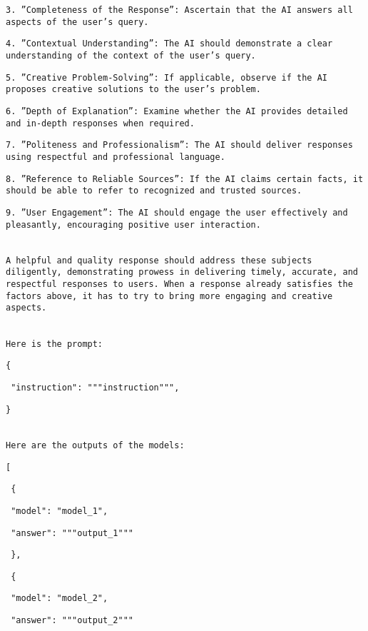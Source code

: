 \texttt{3. ”Completeness of the Response”: Ascertain that the AI answers all aspects of the user’s query.}

\texttt{4. ”Contextual Understanding”: The AI should demonstrate a clear understanding of the context of the user’s query.}

\texttt{5. ”Creative Problem-Solving”: If applicable, observe if the AI proposes creative solutions to the user’s problem.}

\texttt{6. ”Depth of Explanation”: Examine whether the AI provides detailed and in-depth responses when required.}

\texttt{7. ”Politeness and Professionalism”: The AI should deliver responses using respectful and professional language.}

\texttt{8. ”Reference to Reliable Sources”: If the AI claims certain facts, it should be able to refer to recognized and trusted sources.}

\texttt{9. ”User Engagement”: The AI should engage the user effectively and pleasantly, encouraging positive user interaction.}

\texttt{\\A helpful and quality response should address these subjects diligently, demonstrating prowess in delivering timely, accurate, and respectful responses to users. When a response already satisfies the factors above, it has to try to bring more engaging and creative aspects.}

\texttt{\\Here is the prompt:}

\texttt{\{}

\indent\texttt{    "instruction": """{instruction}""",}

\texttt{\}}

\texttt{\\Here are the outputs of the models:}

\texttt{[}

\texttt{    \{}

\hspace*{6mm}\texttt{        "model": "model\_1",}

\hspace*{6mm}\texttt{        "answer": """{output\_1}"""}

\texttt{    \},}

\texttt{    \{}

\hspace*{6mm}\texttt{        "model": "model\_2",}

\hspace*{6mm}\texttt{        "answer": """{output\_2}"""}

